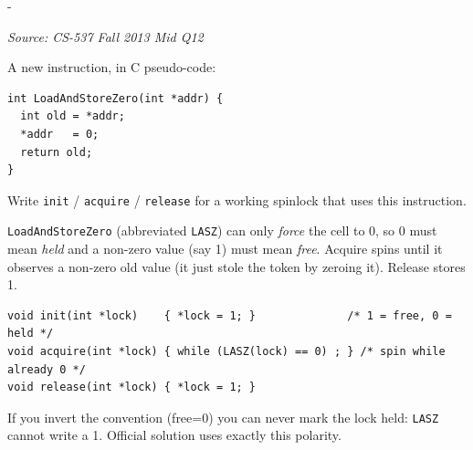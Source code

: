 \documentclass[11pt,a4paper]{article}
\makeatletter
\newcommand{\keepspace}[1]{\par\penalty-100\begingroup
  \setlength{\dimen@}{#1}\dimen@ii\pagegoal\advance\dimen@ii-\pagetotal
  \ifdim\dimen@>\dimen@ii\ifdim\dimen@ii>\z@\vfil\fi\break\fi\endgroup}
\newcounter{qn}[section]
\newenvironment{Qn}[4]{%
  \refstepcounter{qn}\keepspace{7\baselineskip}%
  \begin{tcolorbox}[qboxstyle, title={Q\thesection.\theqn\ \ [#1 \textbar\ #2]\ \ #4}]%
  {\footnotesize\color{g3}\textit{Source: #3}}\par\smallskip%
}{%
  \end{tcolorbox}%
}
\newenvironment{Sol}{%
  \begin{tcolorbox}[sboxstyle, title={Solution}]%
}{%
  \end{tcolorbox}\vspace{0.35em}%
}
\makeatother
\begin{document}
\begin{Qn}{Hard}{Lect 17}{CS-537 Fall 2013 Mid Q12}{Build a spinlock from Load-and-Store-Zero}
A new instruction, in C pseudo-code:

\begin{lstlisting}[numbers=none]
int LoadAndStoreZero(int *addr) {
  int old = *addr;
  *addr   = 0;
  return old;
}
\end{lstlisting}

Write \texttt{init} / \texttt{acquire} / \texttt{release} for a working spinlock that uses this instruction.
\end{Qn}
\begin{Sol}
\texttt{LoadAndStoreZero} (abbreviated \texttt{LASZ}) can only \emph{force} the cell to 0, so 0 must mean \emph{held} and a non-zero value (say 1) must mean \emph{free}. Acquire spins until it observes a non-zero old value (it just stole the token by zeroing it). Release stores 1.

\begin{lstlisting}[numbers=none]
void init(int *lock)    { *lock = 1; }              /* 1 = free, 0 = held */
void acquire(int *lock) { while (LASZ(lock) == 0) ; } /* spin while already 0 */
void release(int *lock) { *lock = 1; }
\end{lstlisting}

If you invert the convention (free=0) you can never mark the lock held: \texttt{LASZ} cannot write a 1. Official solution uses exactly this polarity.
\end{Sol}
\end{document}
